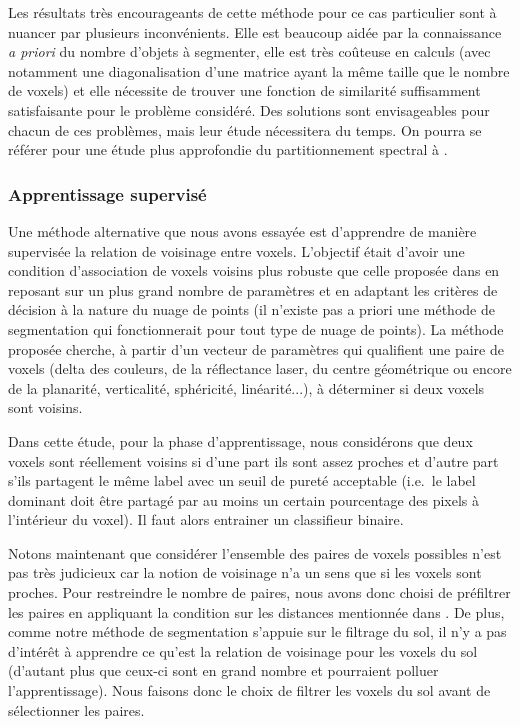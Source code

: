 \documentclass[a4paper, onecolumn, 11pt]{article}
\begin{document}
Les résultats très encourageants de cette méthode pour ce cas particulier sont à nuancer par plusieurs inconvénients. Elle est beaucoup aidée par la connaissance \emph{a priori} du nombre d'objets à segmenter, elle est très coûteuse en calculs (avec notamment une diagonalisation d'une matrice ayant la même taille que le nombre de voxels) et elle nécessite de trouver une fonction de similarité suffisamment satisfaisante pour le problème considéré. Des solutions sont envisageables pour chacun de ces problèmes, mais leur étude nécessitera du temps. On pourra se référer pour une étude plus approfondie du partitionnement spectral à \cite{spectralclustering}.

\subsubsection{Apprentissage supervisé}
Une méthode alternative que nous avons essayée est d'apprendre de manière supervisée la relation de voisinage entre voxels. L'objectif était d'avoir une condition d'association de voxels voisins plus robuste que celle proposée dans \cite{aka_article} en reposant sur un plus grand nombre de paramètres et en adaptant les critères de décision à la nature du nuage de points (il n'existe pas a priori une méthode de segmentation qui fonctionnerait pour tout type de nuage de points). La méthode proposée cherche, à partir d'un vecteur de paramètres qui qualifient une paire de voxels (delta des couleurs, de la réflectance laser, du centre géométrique ou encore de la planarité, verticalité, sphéricité, linéarité...), à déterminer si deux voxels sont voisins. 

Dans cette étude, pour la phase d'apprentissage, nous considérons que deux voxels sont réellement voisins si d'une part ils sont assez proches et d'autre part s'ils partagent le même label avec un seuil de pureté acceptable (i.e.\ le label dominant doit être partagé par au moins un certain pourcentage des pixels à l'intérieur du voxel). Il faut alors entrainer un classifieur binaire. 

Notons maintenant que considérer l'ensemble des paires de voxels possibles n'est pas très judicieux car la notion de voisinage n'a un sens que si les voxels sont proches. Pour restreindre le nombre de paires, nous avons donc choisi de préfiltrer les paires en appliquant la condition sur les distances mentionnée dans  \cite{aka_article}. De plus, comme notre méthode de segmentation s'appuie sur le filtrage du sol, il n'y a pas d'intérêt à apprendre ce qu'est la relation de voisinage pour les voxels du sol (d'autant plus que ceux-ci sont en grand nombre et pourraient polluer l'apprentissage). Nous faisons donc le choix de filtrer les voxels du sol avant de sélectionner les paires. 
\end{document}
